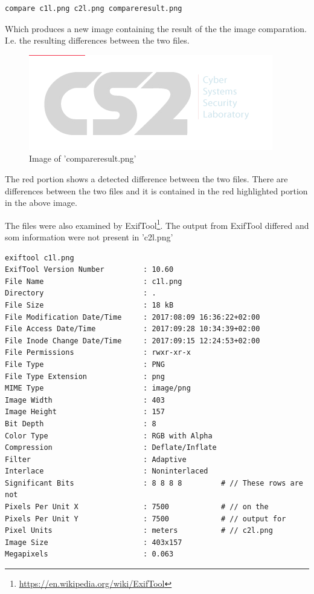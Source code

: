 \documentclass[a4paper,10pt,oneside]{article}
\begin{document}
\begin{lstlisting}
compare c1l.png c2l.png compareresult.png
\end{lstlisting}

Which produces a new image containing the result of the the image comparation. I.e. the resulting differences between the two files.

\begin{figure}[ht]
	\includegraphics[width=\textwidth]{images/compareresult.png}
	\caption{Image of 'compareresult.png'}
	\centering
\end{figure}

The red portion shows a detected difference between the two files. There are differences between the two files and it is contained in the red highlighted portion in the above image.

The files were also examined by ExifTool\footnote{\url{https://en.wikipedia.org/wiki/ExifTool}}. The output from
ExifTool differed and som information were not present in 'c2l.png'

\begin{lstlisting}[caption=ExifTool output for 'c1l.png']
exiftool c1l.png
ExifTool Version Number         : 10.60
File Name                       : c1l.png
Directory                       : .
File Size                       : 18 kB
File Modification Date/Time     : 2017:08:09 16:36:22+02:00
File Access Date/Time           : 2017:09:28 10:34:39+02:00
File Inode Change Date/Time     : 2017:09:15 12:24:53+02:00
File Permissions                : rwxr-xr-x
File Type                       : PNG
File Type Extension             : png
MIME Type                       : image/png
Image Width                     : 403
Image Height                    : 157
Bit Depth                       : 8
Color Type                      : RGB with Alpha
Compression                     : Deflate/Inflate
Filter                          : Adaptive
Interlace                       : Noninterlaced
Significant Bits                : 8 8 8 8         # // These rows are not
Pixels Per Unit X               : 7500            # // on the
Pixels Per Unit Y               : 7500            # // output for
Pixel Units                     : meters          # // c2l.png
Image Size                      : 403x157
Megapixels                      : 0.063
\end{lstlisting}
\end{document}
